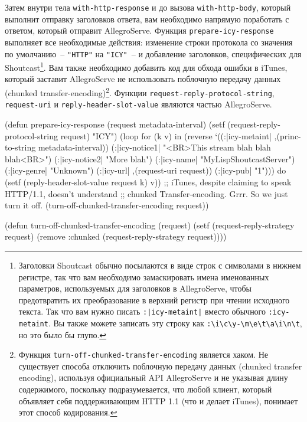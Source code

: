 Затем внутри тела \lstinline{with-http-response} и до вызова \lstinline{with-http-body}, который
выполнит отправку заголовков ответа, вам необходимо напрямую поработать с ответом, который
отправит AllegroServe.  Функция \lstinline{prepare-icy-response} выполняет все необходимые
действия: изменение строки протокола со значения по умолчанию~-- \lstinline{"HTTP"} на
\lstinline{"ICY"}~-- и добавление заголовков, специфических для Shoutcast\footnote{Заголовки
  Shoutcast обычно посылаются в виде строк с символами в нижнем регистре, так что вам
  необходимо замаскировать имена именованных параметров, используемых для заголовков в
  AllegroServe, чтобы предотвратить их преобразование в верхний регистр при чтении
  исходного текста.  Так что вам нужно писать \lstinline{:|icy-metaint|} вместо обычного
  \lstinline{:icy-metaint}.  Вы также можете записать эту строку как
  \lstinline!:\i\c\y-\m\e\t\a\i\n\t!, но это было бы глупо.}.  Вам также необходимо
добавить код для обхода ошибки в iTunes, который заставит AllegroServe не использовать
поблочную передачу данных (chunked transfer-encoding)\footnote{Функция
  \lstinline{turn-off-chunked-transfer-encoding} является хаком.  Не существует способа
  отключить поблочную передачу данных (chunked transfer encoding), используя официальный API AllegroServe и не
  указывая длину содержимого, поскольку подразумевается, что любой клиент, который
  объявляет себя поддерживающим HTTP 1.1 (что и делает iTunes), понимает этот способ
  кодирования.}.  Функции \lstinline{request-reply-protocol-string}, \lstinline{request-uri} и
\lstinline{reply-header-slot-value} являются частью AllegroServe.

\begin{myverb}
(defun prepare-icy-response (request metadata-interval)
  (setf (request-reply-protocol-string request) "ICY")
  (loop for (k v) in (reverse
       `((:|icy-metaint| ,(princ-to-string metadata-interval))
         (:|icy-notice1| "<BR>This stream blah blah blah<BR>")
         (:|icy-notice2| "More blah")
         (:|icy-name|    "MyLispShoutcastServer")
         (:|icy-genre|   "Unknown")
         (:|icy-url|     ,(request-uri request))
         (:|icy-pub|     "1")))
     do (setf (reply-header-slot-value request k) v))
  ;; iTunes, despite claiming to speak HTTP/1.1, doesn't understand
  ;; chunked Transfer-encoding. Grrr. So we just turn it off.
  (turn-off-chunked-transfer-encoding request))

(defun turn-off-chunked-transfer-encoding (request)
  (setf (request-reply-strategy request)
        (remove :chunked (request-reply-strategy request))))
\end{myverb}

